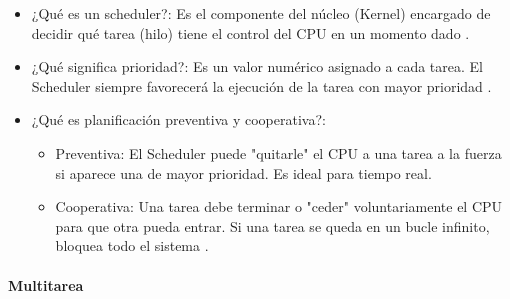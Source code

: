 \begin{itemize}
    \item ¿Qué es un scheduler?: Es el componente del núcleo (Kernel) encargado de decidir qué tarea (hilo) tiene el control del CPU en un momento dado \cite{ortega_2019_scheduler}.
    
    \item ¿Qué significa prioridad?: Es un valor numérico asignado a cada tarea. El Scheduler siempre favorecerá la ejecución de la tarea con mayor prioridad \cite{ortega_2019_scheduler}.
    
    \item ¿Qué es planificación preventiva y cooperativa?:
    
      \begin{itemize}

       \item Preventiva: El Scheduler puede "quitarle" el CPU a una tarea a la fuerza si aparece una de mayor prioridad. Es ideal para tiempo real.
       \item Cooperativa: Una tarea debe terminar o "ceder" voluntariamente el CPU para que otra pueda entrar. Si una tarea se queda en un bucle infinito, bloquea todo el sistema \cite{ortega_2019_scheduler}.
         
     \end{itemize}
  
\end{itemize}


\paragraph{Multitarea}

